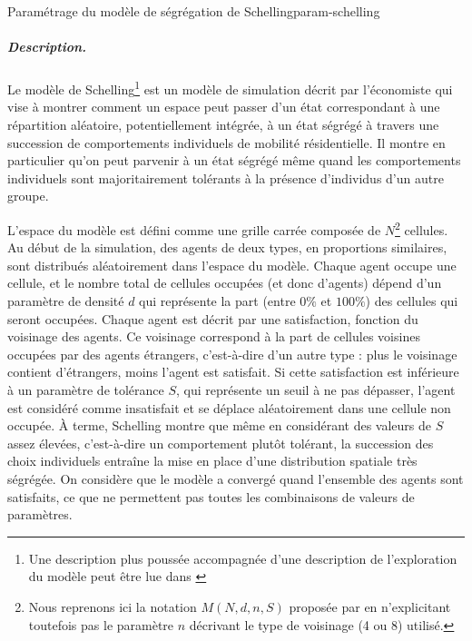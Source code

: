 \begin{encadre}{Paramétrage du modèle de ségrégation de Schelling}{param-schelling}
\renewcommand{\thempfootnote}{\alph{mpfootnote}}

\subparagraph{Description.}
Le modèle de Schelling\footnote{
	Une description plus poussée accompagnée d'une description de l'exploration du modèle peut être lue dans \autocite{daude_comparaison_2006}
} est un modèle de simulation décrit par l'économiste \textcite{schelling_dynamic_1971} qui vise à montrer comment un espace peut passer d'un état correspondant à une répartition aléatoire, potentiellement intégrée, à un état ségrégé à travers une succession de comportements individuels de mobilité résidentielle.
Il montre en particulier qu'on peut parvenir à un état ségrégé même quand les comportements individuels sont majoritairement tolérants à la présence d'individus d'un autre groupe.

L'espace du modèle est défini comme une grille carrée composée de $N$\footnote{
	Nous reprenons ici la notation $M(N, d, n, S)$ proposée par \textcite[433]{daude_comparaison_2006} en n'explicitant toutefois pas le paramètre $n$ décrivant le type de voisinage (4 ou 8) utilisé.
} cellules.
Au début de la simulation, des agents de deux types, en proportions similaires, sont distribués aléatoirement dans l'espace du modèle.
Chaque agent occupe une cellule, et le nombre total de cellules occupées (et donc d'agents) dépend d'un paramètre de densité $d$ qui représente la part (entre $0\%$ et $100\%$) des cellules qui seront occupées.
Chaque agent est décrit par une satisfaction, fonction du voisinage des agents.
Ce voisinage correspond à la part de cellules voisines occupées par des agents \og étrangers\fg{}, c'est-à-dire d'un autre type : plus le voisinage contient d'étrangers, moins l'agent est satisfait.
Si cette satisfaction est inférieure à un paramètre de tolérance $S$, qui représente un seuil à ne pas dépasser, l'agent est considéré comme insatisfait et se déplace aléatoirement dans une cellule non occupée.
À terme, Schelling montre que même en considérant des valeurs de $S$ assez élevées, c'est-à-dire un comportement plutôt tolérant, la succession des choix individuels entraîne la mise en place d'une distribution spatiale très ségrégée.
On considère que le modèle a convergé quand l'ensemble des agents sont satisfaits, ce que ne permettent pas toutes les combinaisons de valeurs de paramètres.


\end{encadre}
